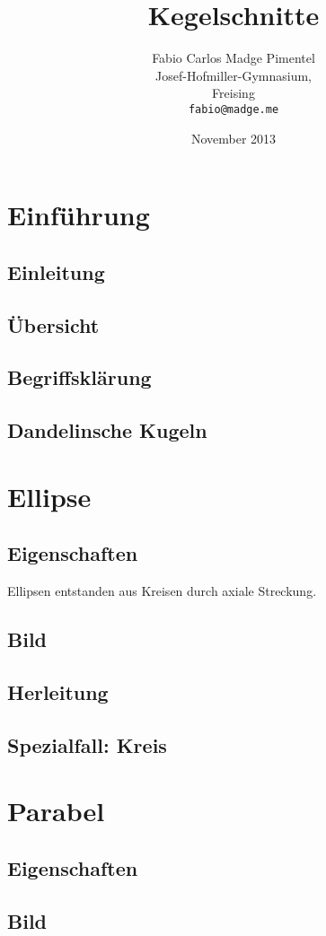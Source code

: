 \documentclass[12pt, a4paper, draft]{report}
\title{Kegelschnitte}
\author{Fabio Carlos Madge Pimentel\\
  Josef-Hofmiller-Gymnasium,\\
  Freising\\
  \texttt{fabio@madge.me}}
\date{November 2013}
\begin{document}


\setcounter{page}{2}
\tableofcontents
\clearpage

\chapter{Einführung}
	\setcounter{section}{0}
	\section{Einleitung}
	\section{Übersicht}
	\section{Begriffsklärung}
	\section{Dandelinsche Kugeln}

\chapter{Ellipse}
	\setcounter{section}{0}
	\section{Eigenschaften}
		Ellipsen entstanden aus Kreisen durch axiale Streckung. ~\cite{Pensel:1993uq}
	\section{Bild}
	\section{Herleitung}
	\section{Spezialfall: Kreis}

\chapter{Parabel}
	\setcounter{section}{0}
	\section{Eigenschaften}
	\section{Bild}
\end{document}
